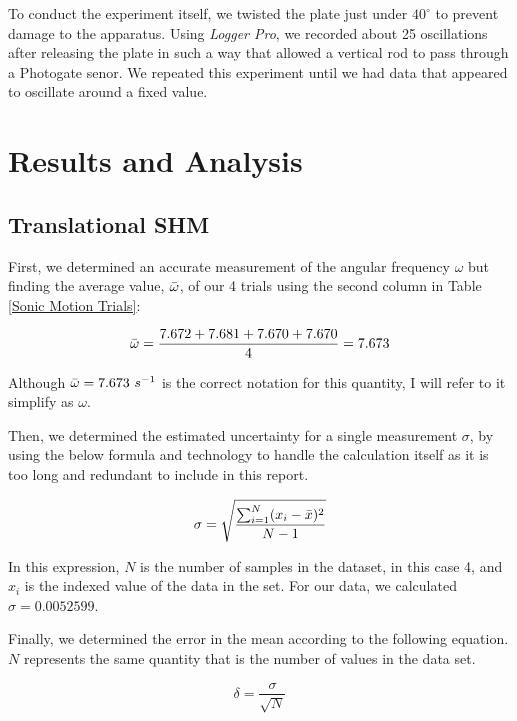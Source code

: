 \documentclass[12pt]{article}
\begin{document}
To conduct the experiment itself, we twisted the plate just under $40^\circ$ to prevent damage to the apparatus. Using \textit{Logger Pro}, we recorded about 25 oscillations after releasing the plate in such a way that allowed a vertical rod to pass through a Photogate senor. We repeated this experiment until we had data that appeared to oscillate around a fixed value.

\section{Results and Analysis}

\subsection{Translational SHM}
First, we determined an accurate measurement of the angular frequency $\omega$ but finding the average value, $\Bar{\omega}$, of our 4 trials using the second column in Table \ref{Sonic Motion Trials}:

\begin{equation*}
    \Bar{\omega}=\frac{7.672+7.681+7.670+7.670}{4}=7.673
\end{equation*}

\noindent Although $\Bar{\omega}=7.673\ s^{-1}$ is the correct notation for this quantity, I will refer to it simplify as $\omega$.

Then, we determined the estimated uncertainty for a single measurement $\sigma$, by using the below formula and technology to handle the calculation itself as it is too long and redundant to include in this report.

\begin{equation}
    \sigma=\sqrt{\frac{\sum^N_{i=1} (x_i - \Bar{x})^2}{N-1}} \label{STD Def}
\end{equation}

\noindent In this expression, $N$ is the number of samples in the dataset, in this case 4, and $x_i$ is the indexed value of the data in the set. For our data, we calculated $\sigma=0.0052599$.

Finally, we determined the error in the mean according to the following equation. $N$ represents the same quantity that is the number of values in the data set.

\begin{equation}
    \delta = \frac{\sigma}{\sqrt{N}}
\end{equation}
\end{document}
